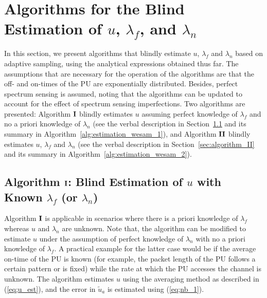 \documentclass[11pt,draftclsnofoot,journal,onecolumn]{IEEEtran}
\begin{document}
\section{Algorithms for the Blind Estimation of $u$, $\lambda_f$, and $\lambda_n$}
\label{sec:algorithm}

In this section, we present algorithms that blindly estimate $u$, $\lambda_f$ and $\lambda_n$ based on adaptive sampling, using the analytical expressions obtained thus far. The assumptions that are necessary for the operation of the algorithms are that the off- and on-times of the PU are exponentially distributed. Besides, perfect spectrum sensing is assumed, noting that the algorithms can be updated to account for the effect of spectrum sensing imperfections. Two algorithms are presented: Algorithm $\bf{I}$ blindly estimates $u$ assuming perfect knowledge of $\lambda_f$ and no a priori knowledge of $\lambda_n$ (see the verbal description in Section~\ref{sec:algorithm_I} and its summary in Algorithm~\ref{alg:estimation_wesam_1}), and Algorithm $\bf{II}$ blindly estimates $u$, $\lambda_f$ and $\lambda_n$ (see the verbal description in Section~\ref{sec:algorithm_II} and its summary in Algorithm~\ref{alg:estimation_wesam_2}). 

\subsection{Algorithm $\bf{I}$: Blind Estimation of $u$ with Known $\lambda_f$ (or $\lambda_n$)}
\label{sec:algorithm_I}

Algorithm $\bf{I}$ is applicable in scenarios where there is a priori knowledge of $\lambda_f$ whereas $u$ and $\lambda_n$ are unknown. Note that, the algorithm can be modified to estimate $u$ under the assumption of perfect knowledge of $\lambda_n$ with no a priori knowledge of $\lambda_f$. A practical example for the latter case would be if the average on-time of the PU is known (for example, the packet length of the PU follows a certain pattern or is fixed) while the rate at which the PU accesses the channel is unknown. The algorithm estimates $u$ using the averaging method as described in (\ref{eq;u_est}), and the error in $\tilde{u}_a$ is estimated using (\ref{eq;nb_1}).
\end{document}
